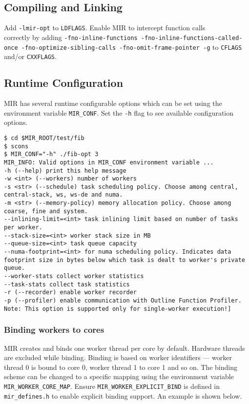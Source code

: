 \documentclass[11pt,a4paper]{article}
\begin{document}
\subsection{Compiling and Linking}\label{compiling-and-linking}

Add \texttt{-lmir-opt} to \texttt{LDFLAGS}. Enable MIR to intercept function calls\\correctly by adding \texttt{{\footnotesize -fno-inline-functions -fno-inline-functions-called-once -fno-optimize-sibling-calls -fno-omit-frame-pointer -g}}  to \texttt{CFLAGS} and/or \texttt{CXXFLAGS}.

\subsection{Runtime Configuration}\label{runtime-configuration}

MIR has several runtime configurable options which can be set using the environment variable \texttt{MIR\_CONF}. Set the \texttt{-h} flag to see available configuration options.

\begin{lstlisting}[style=MyInputStyle]
$ cd $MIR_ROOT/test/fib
$ scons
$ MIR_CONF="-h" ./fib-opt 3
MIR_INFO: Valid options in MIR_CONF environment variable ...
-h (--help) print this help message
-w <int> (--workers) number of workers
-s <str> (--schedule) task scheduling policy. Choose among central, central-stack, ws, ws-de and numa.
-m <str> (--memory-policy) memory allocation policy. Choose among coarse, fine and system.
--inlining-limit=<int> task inlining limit based on number of tasks per worker.
--stack-size=<int> worker stack size in MB
--queue-size=<int> task queue capacity
--numa-footprint=<int> for numa scheduling policy. Indicates data footprint size in bytes below which task is dealt to worker's private queue.
--worker-stats collect worker statistics
--task-stats collect task statistics
-r (--recorder) enable worker recorder
-p (--profiler) enable communication with Outline Function Profiler. Note: This option is supported only for single-worker execution!]
\end{lstlisting}

\subsubsection{Binding workers to cores}\label{binding-workers-to-cores}

MIR creates and binds one worker thread per core by default. Hardware threads are excluded while binding. Binding is based on worker identifiers --- worker thread 0 is bound to core 0, worker thread 1 to core 1 and so on. The binding scheme can be changed to a specific mapping using the environment variable \texttt{MIR\_WORKER\_CORE\_MAP}. Ensure \texttt{MIR\_WORKER\_EXPLICIT\_BIND} is defined in \texttt{mir\_defines.h} to enable explicit binding support. An example is shown below.
\end{document}
